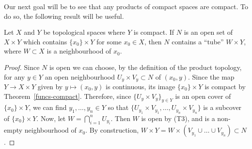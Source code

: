 Our next goal will be to see that any products of compact spaces are compact. To do so, the following result will be useful.

\begin{lem}
  Let $X$ and $Y$ be topological spaces where $Y$ is compact. If $N$ is an open set of $X \times Y$ which contains $\{x_0\} \times Y$ for some $x_0 \in X$, then $N$ contains a ``tube'' $W \times Y$, where $W \subset X$ is a neighbourhood of $x_0$.
\end{lem}
\begin{proof}
  Since $N$ is open we can choose, by the definition of the product topology, for any $y \in Y$ an open neighbourhood $U_y \times V_y \subset N$ of $(x_0,y)$. Since the map $Y \to X \times Y$ given by $y \mapsto (x_0,y)$ is continuous, its image $\{x_0\} \times Y$ is compact by Theorem~\ref{funcs-compact}. Therefore, since $\{U_y \times V_y\}_{y \in Y}$ is an open cover of $\{x_0 \} \times Y$, we can find $y_1, \dots, y_n \in Y$ so that $\{U_{y_1} \times V_{y_1}, \dots, U_{y_n} \times V_{y_n}\}$ is a subcover of $\{x_0 \} \times Y$. Now, let $W = \bigcap_{i=1}^n U_{y_i}$. Then $W$ is open by (T3), and is a non-empty neighbourhood of $x_0$. By construction, $W \times Y = W \times (V_{y_1} \cup \dots \cup V_{y_n}) \subset N$.
\end{proof}

